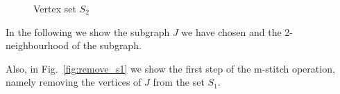 \begin{figure}[H]
\begin{minipage}{0.49\textwidth}
        \caption{Vertex set $S_2$}
    \end{minipage}
\end{figure}

\noindent In the following we show the subgraph $J$ we have chosen and the 2-neighbourhood 
of the subgraph.

\noindent Also, in Fig.~\ref{fig:remove_s1} we show the first step of the m-stitch operation, namely 
removing the vertices of $J$ from the set $S_1$.

